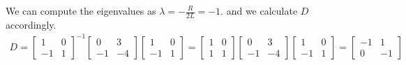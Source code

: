 {  We can compute the eigenvalues as $\lambda = -\frac{R}{2L} = -1.$ and we calculate $D$ accordingly.
  \begin{align*} 
  D = \begin{bmatrix} 1 & 0 \\ -1 & 1 \end{bmatrix}^{-1}
  \begin{bmatrix} 0 & 3 \\ -1 & - 4 \end{bmatrix}
  \begin{bmatrix} 1 & 0 \\ -1 & 1 \end{bmatrix}
  = \begin{bmatrix} 1 & 0 \\ 1 & 1 \end{bmatrix}
  \begin{bmatrix} 0 & 3 \\ -1 & - 4 \end{bmatrix}
  \begin{bmatrix} 1 & 0 \\ -1 & 1 \end{bmatrix}
  = \begin{bmatrix} -1 & 1 \\ 0 & -1 \end{bmatrix}
  \end{align*}

}
